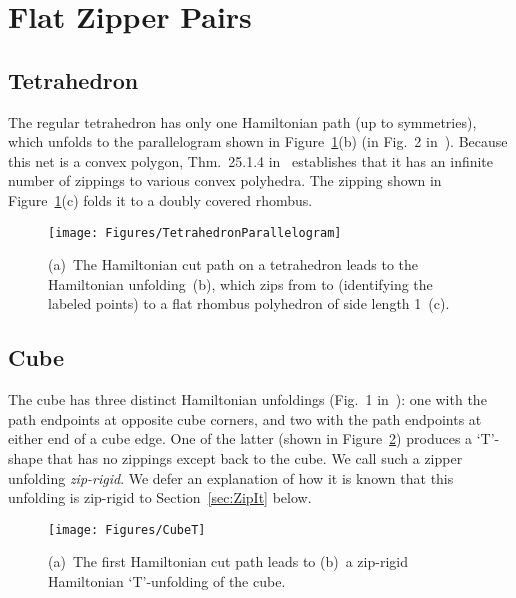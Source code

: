 \pdfoutput=1  \documentclass[]{article}
\newcommand{\figlab}[1]{\label{fig:#1}}
\newcommand{\secref}[1]{\ref{sec:#1}}
\newcommand{\figref}[1]{\ref{fig:#1}}
\begin{document}
\section{Flat Zipper Pairs}
\subsection{Tetrahedron}
The regular tetrahedron has only one Hamiltonian path (up to
symmetries),
which unfolds to the  parallelogram
shown in Figure~\figref{TetrahedronParallelogram}(b)
(in Fig.~2 in~\cite{lddss-zupc-10}).
Because this net is a convex polygon,
Thm.~25.1.4 in~\cite{do-gfalop-07} establishes that it has an infinite
number of zippings to various convex polyhedra.
The zipping shown in Figure~\figref{TetrahedronParallelogram}(c)
folds it to a doubly covered rhombus.
\begin{figure}[htbp]
\centering
\texttt{[image: Figures/TetrahedronParallelogram]}
\caption{(a)~The Hamiltonian cut path on a tetrahedron
leads to the Hamiltonian unfolding~(b),
which zips from  to  (identifying the labeled points) to 
a flat rhombus polyhedron of side length 1~(c).}
\figlab{TetrahedronParallelogram}
\end{figure}


\subsection{Cube}
The cube has three distinct Hamiltonian unfoldings
(Fig.~1 in~\cite{lddss-zupc-10}): one with the path endpoints at
opposite cube corners, and two with the path endpoints at either
end of a cube edge.
One of the latter (shown in Figure~\figref{CubeT}) produces a
`T'-shape
that has no zippings except back to
the cube.
We call such a zipper unfolding \emph{zip-rigid}.
We defer an explanation of how it is known that this
unfolding is zip-rigid to Section~\secref{ZipIt} below.
\begin{figure}[htbp]
\centering
\texttt{[image: Figures/CubeT]}
\caption{(a)~The first Hamiltonian cut path
leads to (b)~a zip-rigid Hamiltonian `T'-unfolding of the cube.}
\figlab{CubeT}
\end{figure}
\end{document}
